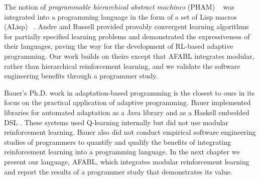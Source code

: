 The notion of {\em programmable hierarchical abstract machines} (PHAM) ~\cite{andre2001programmable} was integrated into a programming language in the form of a set of Lisp macros (ALisp) ~\cite{andre2002state}. Andre and Russell provided provably convergent learning algorithms for partially specified learning problems and demonstrated the expressiveness of their languages, paving the way for the development of RL-based adaptive programming. Our work builds on theirs except that AFABL integrates modular, rather than hierarchical reinforcement learning, and we validate the software engineering benefits through a programmer study.


Bauer's Ph.D. work in adaptation-based programming \cite{bauer2013adaptation} is the closest to ours in its focus on the practical application of adaptive programming. Bauer implemented libraries for automated adaptation as a Java library \cite{bauer2011adaptation} and as a Haskell embedded DSL \cite{bauer2011adaptation-haskell}. These systems used Q-learning internally but did not use modular reinforcement learning. Bauer also did not conduct empirical software engineering studies of programmers to quantify and qualify the benefits of integrating reinforcement learning into a programming language. In the next chapter we present our language, AFABL, which integrates modular reinforcement learning and report the results of a programmer study that demonstrates its value.
